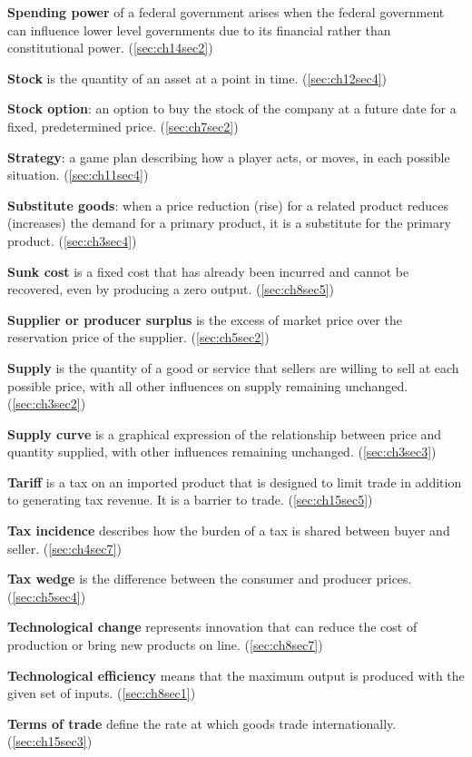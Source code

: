 \textbf{Spending power} of a federal government arises when the federal government can influence lower level governments due to its financial rather than constitutional power. (\ref{sec:ch14sec2})

\textbf{Stock} is the quantity of an asset at a point in time. (\ref{sec:ch12sec4})

\textbf{Stock option}: an option to buy the stock of the company at a future date for a fixed, predetermined price. (\ref{sec:ch7sec2})

\textbf{Strategy}: a game plan describing how a player acts, or moves, in each possible situation. (\ref{sec:ch11sec4})

\textbf{Substitute goods}: when a price reduction (rise) for a related product reduces (increases) the demand for a primary product, it is a substitute for the primary product. (\ref{sec:ch3sec4})

\textbf{Sunk cost} is a fixed cost that has already been incurred and cannot be recovered, even by producing a zero output. (\ref{sec:ch8sec5})

\textbf{Supplier or producer surplus} is the excess of market price over the reservation price of the supplier. (\ref{sec:ch5sec2})

\textbf{Supply} is the quantity of a good or service that sellers are willing to sell at each possible price, with all other influences on supply remaining unchanged. (\ref{sec:ch3sec2})

\textbf{Supply curve} is a graphical expression of the relationship between price and quantity supplied, with other influences remaining unchanged. (\ref{sec:ch3sec3})

\textbf{Tariff} is a tax on an imported product that is designed to limit trade in addition to generating tax revenue. It is a barrier to trade. (\ref{sec:ch15sec5})

\textbf{Tax incidence} describes how the burden of a tax is shared between buyer and seller. (\ref{sec:ch4sec7})

\textbf{Tax wedge} is the difference between the consumer and producer prices. (\ref{sec:ch5sec4})

\textbf{Technological change} represents innovation that can reduce the cost of production or bring new products on line. (\ref{sec:ch8sec7})

\textbf{Technological efficiency} means that the maximum output is produced with the given set of inputs. (\ref{sec:ch8sec1})

\textbf{Terms of trade} define the rate at which goods trade internationally. (\ref{sec:ch15sec3})

